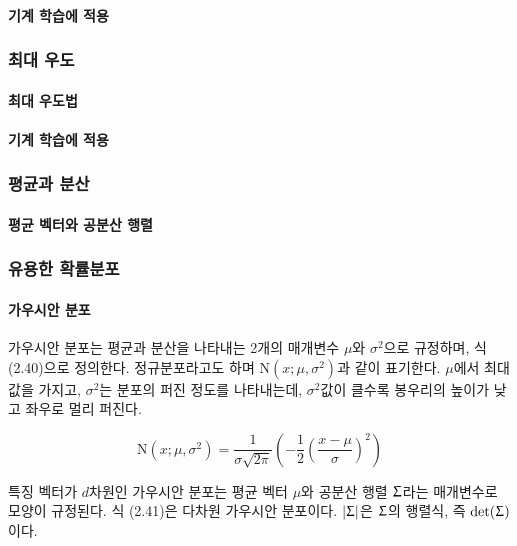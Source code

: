 \documentclass [12pt] {oblivoir}
\let\oldsubsubsection=\subsubsection
\renewcommand{\subsubsection}
{
  \filbreak
  \oldsubsubsection
}
\begin{document}
\paragraph*{기계 학습에 적용}\mbox{}

\subsubsection{최대 우도}

\paragraph*{최대 우도법}\mbox{}

\paragraph*{기계 학습에 적용}\mbox{}

\subsubsection{평균과 분산}

\paragraph*{평균 벡터와 공분산 행렬}\mbox{}

\subsubsection{유용한 확률분포}

\paragraph*{가우시안 분포}\mbox{}

\vspace{3mm}
\;가우시안 분포는 평균과 분산을 나타내는 2개의 매개변수 $\mu$와 $\sigma^{2}$으로 규정하며,
식 (2.40)으로 정의한다. 정규분포라고도 하며 $\text{N}(x; \mu, \sigma^{2})$과 같이 표기한다. $\mu$에서 최대값을 가지고, $\sigma^{2}$는 분포의 퍼진 정도를 나타내는데,
$\sigma^{2}$값이 클수록 봉우리의 높이가 낮고 좌우로 멀리 퍼진다.

\begin{equation} \tag{2.40}
  \text{N}(x; \mu, \sigma^{2}) = \frac{1}{\sigma\sqrt{2\pi}}\left(-\frac{1}{2}\left(\frac{x - \mu}{\sigma}\right)^{2}\right)
\end{equation}

\vspace{3mm}
\;특징 벡터가 $d$차원인 가우시안 분포는 평균 벡터 $\mu$와 공분산 행렬 $\mathbf{\Upsigma}$라는 매개변수로 모양이 규정된다. 식 (2.41)은 다차원 가우시안 분포이다.
$|\mathbf{\Upsigma}|$은 $\mathbf{\Upsigma}$의 행렬식, 즉 $\text{det}(\mathbf{\Upsigma})$이다.
\end{document}
